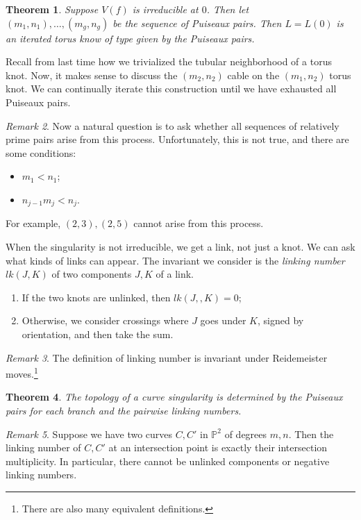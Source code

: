 \documentclass[leqno, openany]{memoir}
\newtheorem{thm}{Theorem}[chapter]
\theoremstyle{definition}
\theoremstyle{remark}
\newtheorem{rmk}[thm]{Remark}
\theoremstyle{plain}
\theoremstyle{definition}
\theoremstyle{remark}
\renewcommand{\P}{\mathbb{P}}
\begin{document}
\begin{thm} Suppose $V(f)$ is irreducible at $0$. Then let $(m_1, n_1), \ldots,
(m_g, n_g)$ be the sequence of Puiseaux pairs. Then $L = L(0)$ is an iterated
torus know of type given by the Puiseaux pairs.  \end{thm}

Recall from last time how we trivialized the tubular neighborhood of a torus
knot. Now, it makes sense to discuss the $(m_2, n_2)$ cable on the $(m_1, n_2)$
torus knot. We can continually iterate this construction until we have
exhausted all Puiseaux pairs. 

\begin{rmk} Now a natural question is to ask whether all sequences of
    relatively prime pairs arise from this process. Unfortunately, this is not
    true, and there are some conditions: \begin{itemize} \item $m_1 < n_1$;
        \item $n_{j-1}m_j < n_j$.  \end{itemize} For example, $(2,3), (2,5)$
        cannot arise from this process.  \end{rmk}

When the singularity is not irreducible, we get a link, not just a knot. We can
ask what kinds of links can appear. The invariant we consider is the
\textit{linking number} $lk(J,K)$ of two components $J,K$ of a link.
\begin{enumerate} \item If the two knots are unlinked, then $lk(J,,K) = 0$;
\item Otherwise, we consider crossings where $J$ goes under $K$, signed by
orientation, and then take the sum.  \end{enumerate}

\begin{rmk} The definition of linking number is invariant under Reidemeister
moves.\footnote{There are also many equivalent definitions.} \end{rmk}

\begin{thm} The topology of a curve singularity is determined by the Puiseaux
pairs for each branch and the pairwise linking numbers.  \end{thm}

\begin{rmk} Suppose we have two curves $C, C'$ in $\P^2$ of degrees $m, n$.
    Then the linking number of $C, C'$ at an intersection point is exactly
    their intersection multiplicity. In particular, there cannot be unlinked
    components or negative linking numbers.  \end{rmk}
\end{document}
